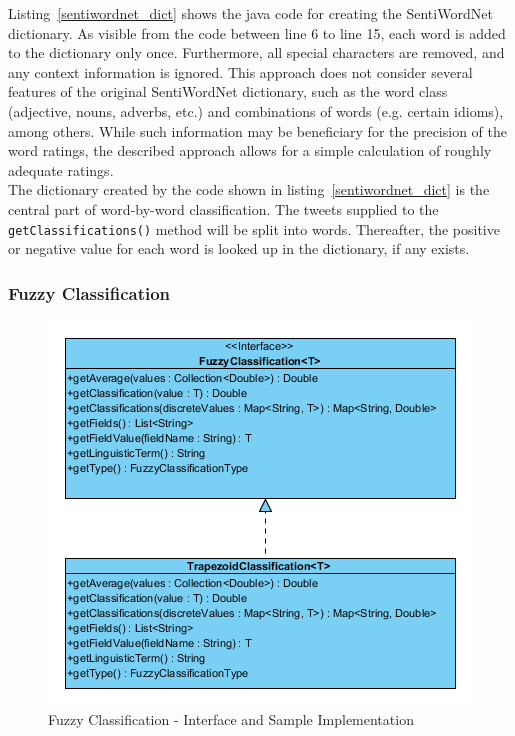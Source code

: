 \documentclass[a4paper]{article}
\begin{document}
Listing~\ref{sentiwordnet_dict} shows the java code for creating the SentiWordNet dictionary. As visible from the code between line 6 to line 15, each word is added to the dictionary only once. Furthermore, all special characters are removed, and any context information is ignored. This approach does not consider several features of the original SentiWordNet dictionary, such as the word class (adjective, nouns, adverbs, etc.) and combinations of words (e.g. certain idioms), among others. While such information may be beneficiary for the precision of the word ratings, the described approach allows for a simple calculation of roughly adequate ratings. \\
The dictionary created by the code shown in listing~\ref{sentiwordnet_dict} is the central part of word-by-word classification. The tweets supplied to the \texttt{getClassifications()} method will be split into words. Thereafter, the positive or negative value for each word is looked up in the dictionary, if any exists.




\subsubsection{Fuzzy Classification}
\begin{figure}[h]
	\centering
	\includegraphics{images/uml_fuzzy.png}
	\caption{Fuzzy Classification - Interface and Sample Implementation}
	\label{uml_fuzzy}
\end{figure}
\end{document}
